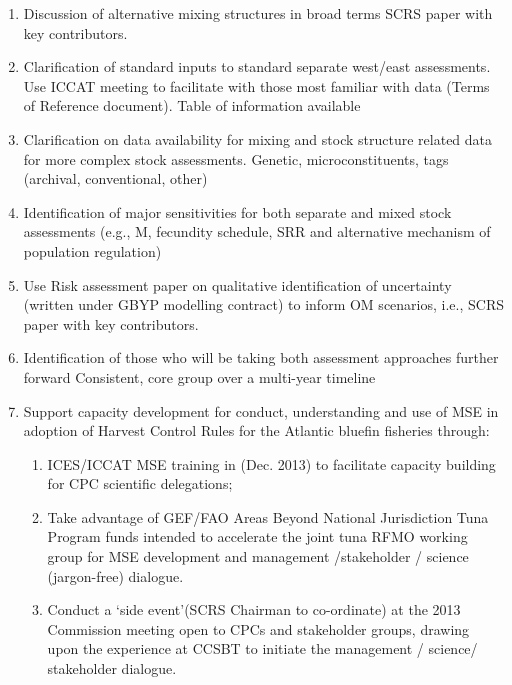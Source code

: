 \begin{enumerate}
\item Discussion of alternative mixing structures in broad terms SCRS paper with key contributors. 
\item Clarification of standard inputs to standard separate west/east assessments. Use ICCAT meeting to facilitate with those most familiar with data (Terms of Reference document). Table of information available 
\item Clarification on data availability for mixing and stock structure related data for more complex stock assessments. Genetic, microconstituents, tags (archival, conventional, other) 
\item Identification of major sensitivities for both separate and mixed stock assessments (e.g., M, fecundity schedule, SRR and alternative mechanism of population regulation) 
\item Use Risk assessment paper on qualitative identification of uncertainty (written under GBYP modelling contract) to inform OM scenarios, i.e., SCRS paper with key contributors. 
\item Identification of those who will be taking both assessment approaches further forward Consistent, core group over a multi-year timeline 
\item Support capacity development for conduct, understanding and use of MSE in adoption of Harvest Control Rules for the Atlantic bluefin fisheries through:
\begin{enumerate}
\item ICES/ICCAT MSE training in (Dec. 2013) to facilitate capacity building for CPC scientific delegations; 
\item Take advantage of GEF/FAO Areas Beyond National Jurisdiction Tuna Program funds intended to accelerate the joint tuna RFMO working group for MSE development and management /stakeholder / science (jargon-free) dialogue. 
\item Conduct a ‘side event’(SCRS Chairman to co-ordinate) at the 2013 Commission meeting open to CPCs and stakeholder groups, drawing upon the experience at CCSBT to initiate the management / science/ stakeholder dialogue. 
\end{enumerate}
\end{enumerate}

